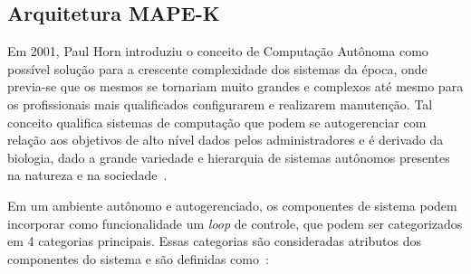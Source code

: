 \documentclass[portugues]{ic-tese}
\begin{document}
\subsection{Arquitetura MAPE-K}

Em 2001, Paul Horn introduziu o conceito de Computação Autônoma como possível solução para a crescente complexidade dos sistemas da época, onde previa-se que os mesmos se tornariam muito grandes e complexos até mesmo para os profissionais mais qualificados configurarem e realizarem manutenção. Tal conceito qualifica sistemas de computação que podem se autogerenciar com relação aos objetivos de alto nível dados pelos administradores e é derivado da biologia, dado a grande variedade e hierarquia de sistemas autônomos presentes na natureza e na sociedade~\citep{Kephart_2003}. 

Em um ambiente autônomo e autogerenciado, os componentes de sistema podem incorporar como funcionalidade um \textit{loop} de controle, que podem ser categorizados em 4 categorias principais. Essas categorias são consideradas atributos dos componentes do sistema e são definidas como~\citep{IBM_2005}:
\end{document}
